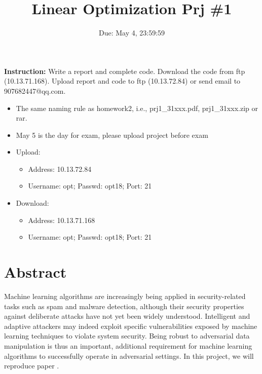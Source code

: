 \documentclass[12pt]{article}
\title{\textbf{Linear Optimization Prj \#1}}
\author{Due: May 4, 23:59:59}
\date{}
\providecommand{\tightlist}{%
	\setlength{\itemsep}{0pt}\setlength{\parskip}{0pt}}
\begin{document}
\maketitle

\textbf{\color{NavyBlue}Instruction:} Write a report and complete code. Download the code from ftp (10.13.71.168). Upload
report and code to ftp (10.13.72.84) or send email to 907682447@qq.com.
\begin{itemize}
	\tightlist
	\item The same naming rule as homework2, i.e., prj1\_31xxx.pdf, prj1\_31xxx.zip or rar.
    \item May 5 is the day for exam, please upload project before exam
	\item Upload:
	      \begin{itemize}
		      \tightlist
		      \item    Address: 10.13.72.84
		      \item Username: opt; Passwd:  opt18; Port: 21
	      \end{itemize}
	\item Download:
	      \begin{itemize}
		      \tightlist
		      \item Address: 10.13.71.168
		      \item  Username: opt; Passwd:  opt18; Port: 21
	      \end{itemize}
\end{itemize}

\section{Abstract} 
Machine learning algorithms are increasingly being applied in security-related tasks such as spam and
malware detection, although their security properties against deliberate attacks have not yet been
widely understood. Intelligent and adaptive attackers may indeed exploit specific vulnerabilities
exposed by machine learning techniques to violate system security. Being robust to adversarial
data manipulation is thus an important, additional requirement for machine learning algorithms to
successfully operate in adversarial settings. In this project, we will reproduce paper \cite{biggio2011support}. 
\end{document}
